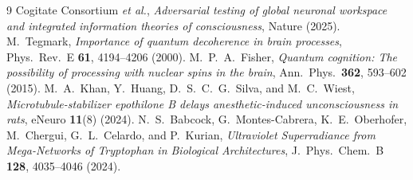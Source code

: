 \documentclass[11pt,a4paper]{article}
\theoremstyle{plain}
\theoremstyle{remark}
\begin{document}
\clearpage
\begin{thebibliography}{9}
Cogitate Consortium \emph{et al.}, \emph{Adversarial testing of global neuronal workspace and integrated information theories of consciousness}, Nature (2025).
M.~Tegmark, \emph{Importance of quantum decoherence in brain processes}, Phys.\ Rev.\ E \textbf{61}, 4194--4206 (2000).
M.~P.~A.~Fisher, \emph{Quantum cognition: The possibility of processing with nuclear spins in the brain}, Ann.\ Phys.\ \textbf{362}, 593--602 (2015).
M.~A.~Khan, Y.~Huang, D.~S.~C.~G.~Silva, and M.~C.~Wiest, \emph{Microtubule-stabilizer epothilone B delays anesthetic-induced unconsciousness in rats}, eNeuro \textbf{11}(8) (2024).
N.~S.~Babcock, G.~Montes-Cabrera, K.~E.~Oberhofer, M.~Chergui, G.~L.~Celardo, and P.~Kurian, \emph{Ultraviolet Superradiance from Mega-Networks of Tryptophan in Biological Architectures}, J.\ Phys.\ Chem.\ B \textbf{128}, 4035--4046 (2024).
\end{thebibliography}
\end{document}
